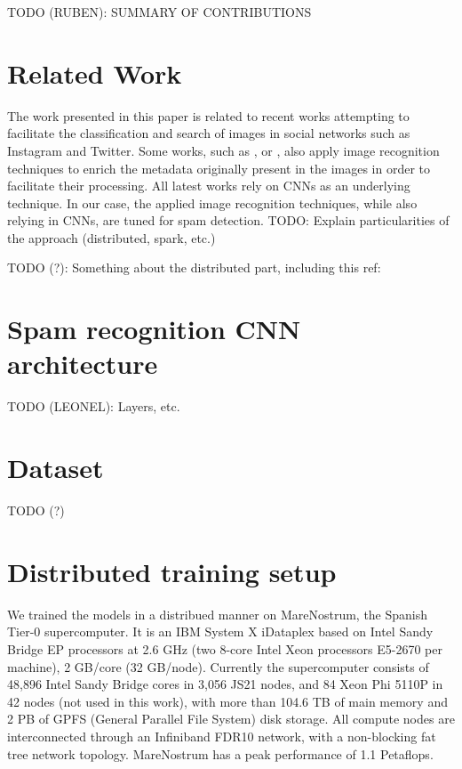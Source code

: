 \documentclass[smallextended]{svjour3}       %
\begin{document}
TODO (RUBEN): SUMMARY OF CONTRIBUTIONS


\section{Related Work}
\label{sec:1}
The work presented in this paper is related to recent works attempting to facilitate the classification and search of images in social networks such as Instagram and Twitter. Some works, such as \cite{DBLP:journals/corr/ParkLK16}, \cite{conf/bigmm/TousTA15} or \cite{Denton:2015:UCH:2783258.2788576}, also apply image recognition techniques to enrich the metadata originally present in the images in order to facilitate their processing. All latest works rely on CNNs as an underlying technique. In our case, the applied image recognition techniques, while also relying in CNNs, are tuned for spam detection. TODO: Explain particularities of the approach (distributed, spark, etc.)
 
TODO (?): Something about the distributed part, including this ref: \cite{conf/bigdataconf/TousGTTGALBCV15}

\section{Spam recognition CNN architecture}

TODO (LEONEL): Layers, etc.

\section{Dataset}

TODO (?)

\section{Distributed training setup}

We trained the models in a distribued manner on MareNostrum, the Spanish Tier-0 supercomputer. It is an IBM System X iDataplex based on Intel Sandy Bridge EP processors at 2.6 GHz (two 8-core Intel Xeon processors E5-2670 per machine), 2 GB/core (32 GB/node). Currently the supercomputer consists of 48,896 Intel Sandy Bridge cores in 3,056 JS21 nodes, and 84 Xeon Phi 5110P in 42 nodes (not used in this work), with more than 104.6 TB of main memory and 2 PB of GPFS (General Parallel File System) disk storage. All compute nodes are interconnected through an Infiniband FDR10 network, with a non-blocking fat tree network topology. MareNostrum has a peak performance of 1.1 Petaflops.
\end{document}
